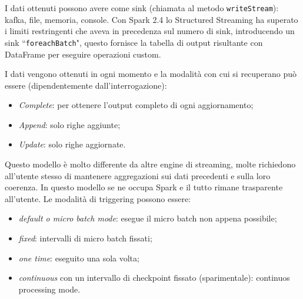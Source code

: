 \documentclass[12pt,italian]{article}
\begin{document}
I dati ottenuti possono avere come sink (chiamata al metodo \texttt{writeStream}): kafka, file, memoria, console.
Con Spark 2.4 lo Structured Streaming ha superato i limiti restringenti che aveva in precedenza sul numero di sink, introducendo un sink ``\texttt{foreachBatch}", questo fornisce la tabella di output risultante con DataFrame per eseguire operazioni custom.
\par I dati vengono ottenuti in ogni momento e la modalità con cui si recuperano può essere (dipendentemente dall'interrogazione): 
\begin{itemize}
	\item \textit{Complete}: per ottenere l'output completo di ogni aggiornamento;
	\item \textit{Append}: solo righe aggiunte;
	\item \textit{Update}: solo righe aggiornate.
\end{itemize}

Questo modello è molto differente da altre engine di streaming, molte richiedono all'utente stesso di mantenere aggregazioni sui dati precedenti e sulla loro coerenza.
In questo modello se ne occupa Spark e il tutto rimane trasparente all'utente.
Le modalità di triggering possono essere:
\begin{itemize}
	\item \textit{default o micro batch mode}: esegue il micro batch non appena possibile;
	\item \textit{fixed}: intervalli di micro batch fissati;
	\item \textit{one time}: eseguito una sola volta;
	\item \textit{continuous} con un intervallo di checkpoint fissato (sparimentale): continuos processing mode.
\end{itemize}
\end{document}
